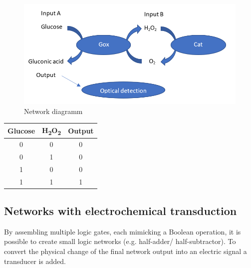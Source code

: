 \documentclass[runningheads]{llncs}
\begin{document}
		\begin{figure}[H] \centering \includegraphics[scale= 0.4]{pics/ANDneu.png} \caption{Network diagramm} \label{img:and} \end{figure}
		
		\begin{center}
		\begin{tabular}{c|c|c}
			Glucose & H\textsubscript{2}O\textsubscript{2} & Output\\\hline
			0 & 0 & 0\\ 
			0 & 1 & 0\\
			1 & 0 & 0\\
			1 & 1 & 1
		\end{tabular}
		\end{center}
	
\subsection{Networks with electrochemical transduction}

		By assembling multiple logic gates, each mimicking a Boolean operation, it is possible to create small logic networks (e.g. half-adder/ half-subtractor). To convert the physical change of the final network output into an electric signal a transducer is added.
	
\end{document}
